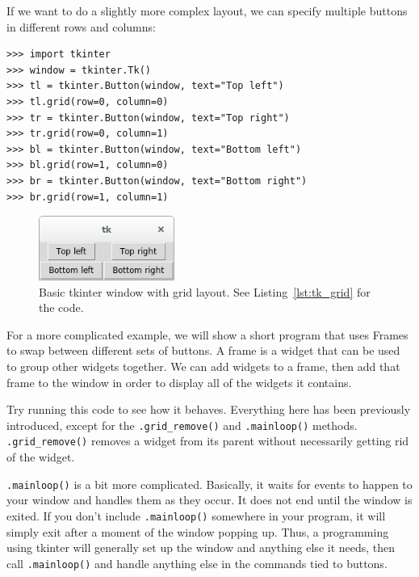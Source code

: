 \documentclass[11pt]{cselabheader}
\begin{document}
If we want to do a slightly more complex layout, we can specify multiple buttons
in different rows and columns:

\begin{lstlisting}[style=ipython,caption={Multiple buttons in tkinter. See Figure~\ref{fig:tk_grid}},label={lst:tk_grid}]
>>> import tkinter
>>> window = tkinter.Tk()
>>> tl = tkinter.Button(window, text="Top left")
>>> tl.grid(row=0, column=0)
>>> tr = tkinter.Button(window, text="Top right")
>>> tr.grid(row=0, column=1)
>>> bl = tkinter.Button(window, text="Bottom left")
>>> bl.grid(row=1, column=0)
>>> br = tkinter.Button(window, text="Bottom right")
>>> br.grid(row=1, column=1)
\end{lstlisting}

\begin{figure}[h]
  \centering
  \includegraphics[width=1.75in]{img/tk_grid.png}
  \caption{Basic tkinter window with grid layout. See Listing~\ref{lst:tk_grid}
for the code.}
  \label{fig:tk_grid}
\end{figure}

For a more complicated example, we will show a short program that uses Frames to
swap between different sets of buttons. A frame is a widget that can be used
to group other widgets together. We can add widgets to a frame, then add
that frame to the window in order to display all of the widgets it contains.



Try running this code to see how it behaves. Everything here has been previously
introduced, except for the \lstinline{.grid_remove()} and
\lstinline{.mainloop()} methods. \lstinline{.grid_remove()} removes a widget
from its parent without necessarily getting rid of the widget.

\lstinline!.mainloop()! is a bit more
complicated. Basically, it waits for events to happen to your window and handles
them as they occur. It does not end until the window is exited. If you don't
include \lstinline!.mainloop()! somewhere in your program, it will simply exit
after a moment of the window popping up. Thus, a programming using tkinter
will generally set up the window and anything else it needs, then call
\lstinline{.mainloop()} and handle anything else in the commands tied to
buttons.
\end{document}
